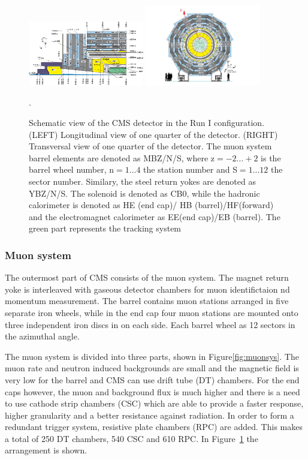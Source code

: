 \begin{figure}[ht!]
	\centering
	\includegraphics[width=0.45\textwidth]{2_ExperimentalSetup/Figures/cmsview1}
	\includegraphics[width=0.45\textwidth]{2_ExperimentalSetup/Figures/cmsview}
 \caption{Schematic view of the CMS detector in the Run I configuration. (LEFT) Longitudinal view of one quarter of the detector. (RIGHT)  Transversal view of one quarter of the detector. The muon system barrel elements are denoted as MBZ/N/S, where z$=-2...+2$ is the barrel wheel number, n$=1...4$ the station number and S$=1...12$ the sector number. Similary, the steel return yokes are denoted as YBZ/N/S. The solenoid is denoted as CB0, while the hadronic calorimeter is denoted as HE (end cap)/ HB (barrel)/HF(forward) and the electromagnet calorimeter as EE(end cap)/EB (barrel). The green part represents the tracking system\cite{Chatrchyan:1223944}}.
	\label{fig:CMSview}
\end{figure}

\subsubsection{Muon system}
The outermost part of CMS consists of the muon system. The magnet return yoke is interleaved with gaseous detector chambers for muon identifictaion nd momentum measurement. The barrel contains muon stations arranged in five separate iron wheels, while in the end cap four muon stations are mounted onto three independent iron discs in on each side. Each barrel wheel as 12 sectors in the azimuthal angle. 

The muon system is divided into three parts\cite{Chatrchyan:1223944}, shown in Figure\ref{fig:muonsys}. The muon rate and neutron induced backgrounds are small and the magnetic field is very low for the barrel and CMS can use drift tube (DT) chambers. For the end caps however, the muon and background flux is much higher and there is a need to use cathode strip chambers (CSC) which are able to provide a faster response, higher granularity and a better resistance against radiation. In order to form a redundant trigger system, resistive plate chambers (RPC) are added. This makes a total of 250 DT chambers, 540 CSC and 610 RPC. In Figure~\ref{fig:CMSview} the arrangement is shown.



